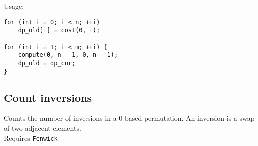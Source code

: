 Usage:
\begin{lstlisting}
for (int i = 0; i < n; ++i)
	dp_old[i] = cost(0, i);

for (int i = 1; i < m; ++i) {
	compute(0, n - 1, 0, n - 1);
	dp_old = dp_cur;
}
\end{lstlisting}

\subsection{Count inversions}
 Counts the number of inversions in a 0-based permutation.
An inversion is a swap of two adjacent elements. \\
Requires \verb|Fenwick|
